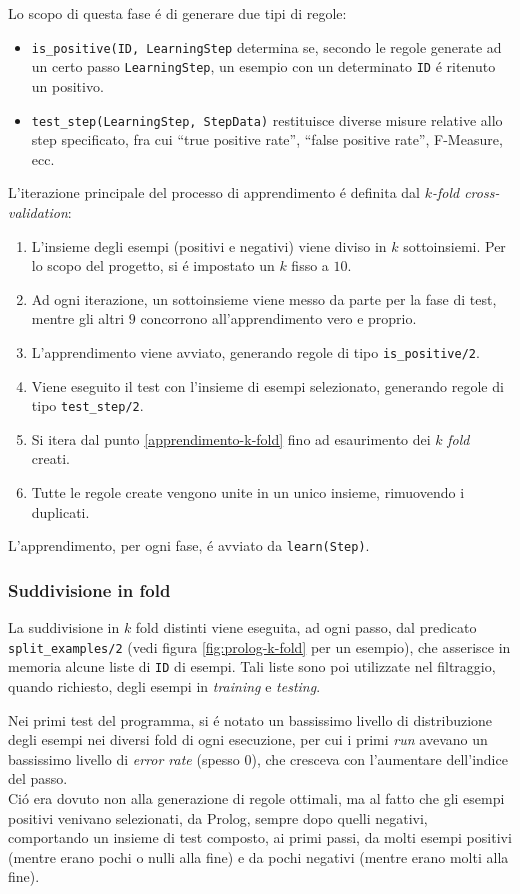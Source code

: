 \documentclass[preprint]{acm_proc_article-sp}
\begin{document}
Lo scopo di questa fase \'e di generare due tipi di regole:
\begin{itemize}
\item \verb|is_positive(ID, LearningStep| determina se, secondo le regole generate ad un certo passo \verb|LearningStep|, un esempio con un determinato \verb|ID| \'e ritenuto un positivo.
\item \verb|test_step(LearningStep, StepData)| restituisce diverse misure relative allo step specificato, fra cui ``true positive rate'', ``false positive rate'', F-Measure, ecc.
\end{itemize}

L'iterazione principale del processo di apprendimento \'e definita dal $k$\textit{-fold cross-validation}:
\begin{enumerate}
\item L'insieme degli esempi (positivi e negativi) viene diviso in $k$ sottoinsiemi. Per lo scopo del progetto, si \'e impostato un $k$ fisso a $10$.
\item\label{apprendimento-k-fold} Ad ogni iterazione, un sottoinsieme viene messo da parte per la fase di test, mentre gli altri $9$ concorrono all'apprendimento vero e proprio.
\item L'apprendimento viene avviato, generando regole di tipo \verb|is_positive/2|.
\item Viene eseguito il test con l'insieme di esempi selezionato, generando regole di tipo \verb|test_step/2|.
\item Si itera dal punto \ref{apprendimento-k-fold} fino ad esaurimento dei $k$ \textit{fold} creati.
\item Tutte le regole create vengono unite in un unico insieme, rimuovendo i duplicati.
\end{enumerate}

L'apprendimento, per ogni fase, \'e avviato da \verb|learn(Step)|.

\subsubsection{Suddivisione in fold}
La suddivisione in $k$ fold distinti viene eseguita, ad ogni passo, dal predicato \verb|split_examples/2| (vedi figura \ref{fig:prolog-k-fold} per un esempio), che asserisce in memoria alcune liste di \verb|ID| di esempi. Tali liste sono poi utilizzate nel filtraggio, quando richiesto, degli esempi in \textit{training} e \textit{testing}.

Nei primi test del programma, si \'e notato un bassissimo livello di distribuzione degli esempi nei diversi fold di ogni esecuzione, per cui i primi \textit{run} avevano un bassissimo livello di \textit{error rate} (spesso $0$), che cresceva con l'aumentare dell'indice del passo.\\
Ci\'o era dovuto non alla generazione di regole ottimali, ma al fatto che gli esempi positivi venivano selezionati, da Prolog, sempre dopo quelli negativi, comportando un insieme di test composto, ai primi passi, da molti esempi positivi (mentre erano pochi o nulli alla fine) e da pochi negativi (mentre erano molti alla fine).
\end{document}
